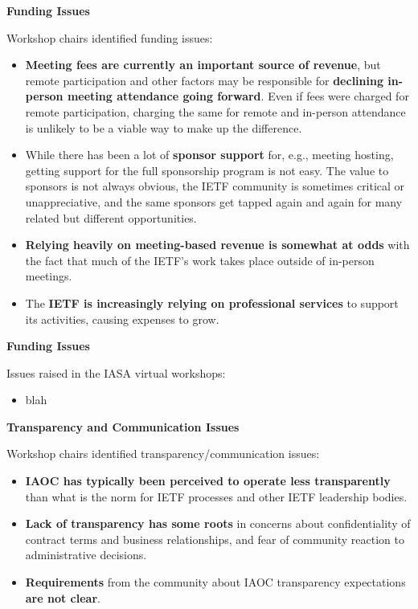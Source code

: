 \documentclass[helvetica]{seminar}
\newcommand{\heading}[1]{%
  \begin{center} 
    \large\bf 
    #1 
  \end{center} 
  \vspace{.4 in}}
\begin{document}
\begin{slide}
\heading{Funding Issues}

Workshop chairs identified funding issues:
{\footnotesize
\begin{itemize}
\item \textbf{Meeting fees are currently an important source of
  revenue}, but remote participation and other factors may be
  responsible for \textbf{declining in-person meeting attendance going
    forward}.  Even if fees were charged for remote participation,
  charging the same for remote and in-person attendance is unlikely to
  be a viable way to make up the difference.
\item While there has been a lot of \textbf{sponsor support} for,
  e.g., meeting hosting, getting support for the full sponsorship
  program is not easy.  The value to sponsors is not always obvious,
  the IETF community is sometimes critical or unappreciative, and the
  same sponsors get tapped again and again for many related but
  different opportunities.
\item \textbf{Relying heavily on meeting-based revenue is somewhat at
  odds} with the fact that much of the IETF's work takes place outside
  of in-person meetings.
\item The \textbf{IETF is increasingly relying on professional
  services} to support its activities, causing expenses to grow.
\end{itemize}
}

\end{slide}

\begin{slide}
\heading{Funding Issues}

Issues raised in the IASA virtual workshops:
\begin{itemize}
\item blah
\end{itemize}

\end{slide}


\begin{slide}
\heading{Transparency and Communication Issues}

Workshop chairs identified transparency/communication issues:
{\footnotesize
\begin{itemize}
\item \textbf{IAOC has typically been perceived to operate less
  transparently} than what is the norm for IETF processes and other
  IETF leadership bodies.
\item \textbf{Lack of transparency has some roots} in concerns about
  confidentiality of contract terms and business relationships, and
  fear of community reaction to administrative decisions.
\item \textbf{Requirements} from the community about IAOC transparency
  expectations \textbf{are not clear}.
\end{itemize}
}

\end{slide}
\end{document}
